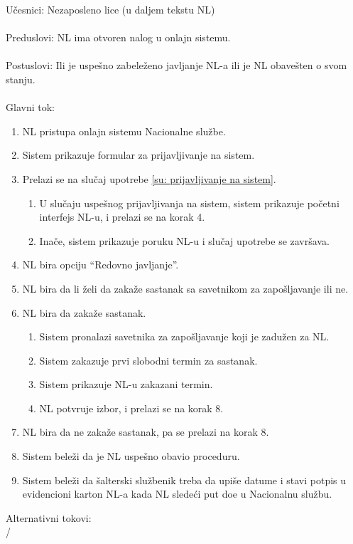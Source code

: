 \noindent U\v cesnici: Nezaposleno lice (u daljem tekstu NL)
\\
\\ Preduslovi: NL ima otvoren nalog u onlajn sistemu.
\\
\\ Postuslovi: Ili je uspe\v sno zabele\v zeno javljanje NL-a ili je NL obave\v sten o svom stanju.
\\ 
\\ Glavni tok:
\begin{enumerate}
	\item NL pristupa onlajn sistemu Nacionalne slu\v zbe.
	\item Sistem prikazuje formular za prijavljivanje na sistem.
	\item Prelazi se na slu\v caj upotrebe \ref{su: prijavljivanje na sistem}.
	\begin{enumerate}
		\item U slu\v caju uspe\v snog prijavljivanja na sistem, sistem prikazuje po\v cetni interfejs NL-u, i prelazi se na korak 4.
		\item Ina\v ce, sistem prikazuje poruku NL-u i slu\v caj upotrebe se zavr\v sava.
	\end{enumerate}
	\item NL bira opciju ``Redovno javljanje''.
	\item NL bira da li \v zeli da zaka\v ze sastanak sa savetnikom za zapo\v sljavanje ili ne.
	\item NL bira da zaka\v ze sastanak.
	\begin{enumerate}
		\item Sistem pronalazi savetnika za zapo\v sljavanje koji je zadu\v zen za NL.
		\item Sistem zakazuje prvi slobodni termin za sastanak.
		\item Sistem prikazuje NL-u zakazani termin.
		\item NL potvr\dj uje izbor, i prelazi se na korak 8.
	\end{enumerate}
	\item NL bira da ne zaka\v ze sastanak, pa se prelazi na korak 8.
	\item Sistem bele\v zi da je NL uspe\v sno obavio proceduru.
	\item Sistem bele\v zi da \v salterski slu\v zbenik treba da upi\v se datume i stavi potpis u evidencioni karton NL-a kada NL slede\'ci put do\dj e u Nacionalnu slu\v zbu.
\end{enumerate}

\noindent Alternativni tokovi: 
\\/

